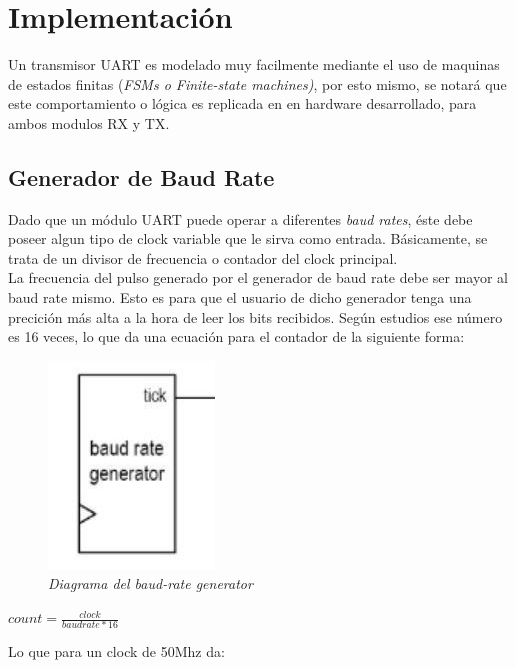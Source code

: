 \documentclass{article}
\begin{document}
\section{Implementación}
Un transmisor UART es modelado muy facilmente mediante el uso de maquinas de estados finitas (\textit{FSMs o Finite-state machines)},
por esto mismo, se notará que este comportamiento o lógica es replicada en en hardware desarrollado, para ambos modulos RX y TX. \\

\subsection{Generador de Baud Rate}
\indent Dado que un módulo UART puede operar a diferentes \textit{baud rates}, éste debe poseer algun tipo de clock variable que le
sirva como entrada. Básicamente, se trata de un divisor de frecuencia o contador del clock principal. \\
\indent La frecuencia del pulso generado por el generador de baud rate debe ser mayor al baud rate mismo. Esto es para que
el usuario de dicho generador tenga una precición más alta a la hora de leer los bits recibidos. Según estudios ese número es
16 veces, lo que da una ecuación para el contador de la siguiente forma: \\

\begin{figure}[H]
    \begin{center}
        \includegraphics[scale=0.5]{baudrategenerator}
        \caption{\textit{Diagrama del baud-rate generator}}
    \end{center}
\end{figure}

\begin{center}
    $ count = \frac{clock}{baudrate * 16} $
\end{center}

Lo que para un clock de 50Mhz da:
\end{document}
